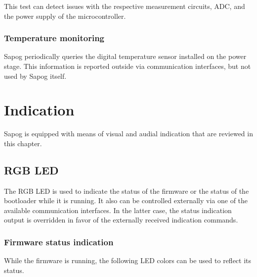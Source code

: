\documentclass{zubaxdoc}
\begin{document}
This test can detect issues with the respective measurement circuits,
ADC, and the power supply of the microcontroller.

\subsection{Temperature monitoring}

Sapog periodically queries the digital temperature sensor installed on the power stage.
This information is reported outside via communication interfaces, but not used
by Sapog itself.

\chapter{Indication}\label{sec:indication}

Sapog is equipped with means of visual and audial indication that are reviewed in this chapter.

\section{RGB LED}

The RGB LED is used to indicate the status of the firmware or the status of the bootloader while it is running.
It also can be controlled externally via one of the available communication interfaces.
In the latter case, the status indication output is overridden in favor of the externally
received indication commands.

\newcommand{\ShowSolidColor}[1]{%
	{\color{#1}\rule{0.4em}{0.8em}\rule{0.4em}{0.8em}\rule{0.4em}{0.8em}\rule{0.4em}{0.8em}\rule{0.4em}{0.8em}}%
}
\newcommand{\ShowBlinkingColor}[1]{{%
		\color{#1}\rule{0.4em}{0.8em}%
		\color{black}\rule{0.4em}{0.8em}%
		\color{#1}\rule{0.4em}{0.8em}%
		\color{black}\rule{0.4em}{0.8em}%
		\color{#1}\rule{0.4em}{0.8em}%
}}

\subsection{Firmware status indication}

While the firmware is running, the following LED colors can be used to reflect its status.
\end{document}
